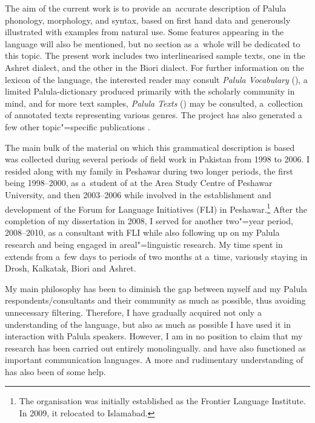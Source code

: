 The aim of the current work is to provide an~accurate description of Palula phonology, morphology,
and syntax, based on first hand data and generously illustrated with examples from natural use. Some
 features appearing in the language will also be mentioned, but no section as a~whole will
be dedicated to this topic. The present work includes two interlinearised sample texts, one in the Ashret dialect, and the other in the Biori dialect. For further information on the lexicon of the language, the interested reader may consult \textit{Palula Vocabulary} (\citealt{liljegrenhaider2011}), a limited Palula-\iliEnglish dictionary produced primarily with the scholarly community in mind, and for more text samples, \textit{Palula Texts} (\citealt{liljegrenhaider2015}) may be consulted, a~collection of annotated texts representing various genres. The project has also generated a few other topic"=specific publications \citep{liljegren2009,liljegrenhaider2009,liljegren2010,liljegrenhaider2015b}. 


The main bulk of the material on which this grammatical description is based was collected during
several periods of field work in Pakistan from 1998 to 2006. I resided along with my family in
Peshawar during two longer periods, the first being 1998--2000, as a~student of \iliPashto at the Area
Study Centre of Peshawar University, and then 2003--2006 while involved in the establishment and
development of the Forum for Language Initiatives (FLI) in Peshawar.\footnote{The organisation was initially established as the Frontier Language Institute. In 2009, it relocated to Islamabad.} After the completion of my dissertation in 2008, I served for another two"=year period, 2008--2010, as a consultant with FLI while also following up on my Palula research and being engaged in areal"=linguistic research. My time spent in \iliChitral extends from
a~few days to periods of two months at a~time, variously staying in Drosh, Kalkatak, Biori and Ashret.


My main philosophy has been to diminish the gap between myself and my Palula respondents/consultants
and their community as much as possible, thus avoiding unnecessary filtering. Therefore, I have
gradually acquired not only a~ understanding of the language, but also as much as possible I
have used it in interaction with Palula speakers. However, I am in no position to claim that my
research has been carried out entirely monolingually. \iliEnglish and \iliPashto have also functioned as important
communication languages. A more  and rudimentary understanding of \iliUrdu has also been of some
help.


